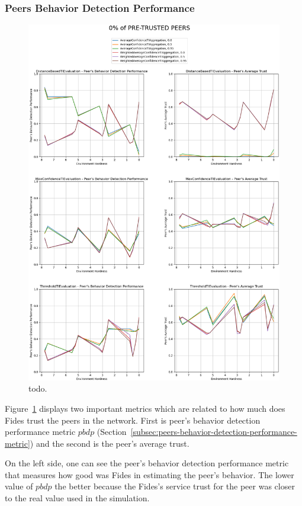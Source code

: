\cleartoleftpage
\subsubsection{Peers Behavior Detection Performance}

\begin{figure}[hp]
    \centering
    \includegraphics[width=1.0\textwidth]{assets/0_peer_trust.png}
    \caption{todo.}
    \label{fig:0-peer-trust}
\end{figure}

Figure~\ref{fig:0-peer-trust} displays two important metrics which are related to how much does Fides trust the peers in the network. First is peer's behavior detection performance metric $pbdp$ (Section~\ref{subsec:peers-behavior-detection-performance-metric}) and the second is the peer's average trust.

On the left side, one can see the peer's behavior detection performance metric that measures how good was Fides in estimating the peer's behavior. The lower value of $pbdp$ the better because the Fides's service trust for the peer was closer to the real value used in the simulation.


